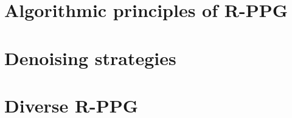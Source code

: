 \section{Algorithmic principles of R-PPG}

\section{Denoising strategies}

\section{Diverse R-PPG}


